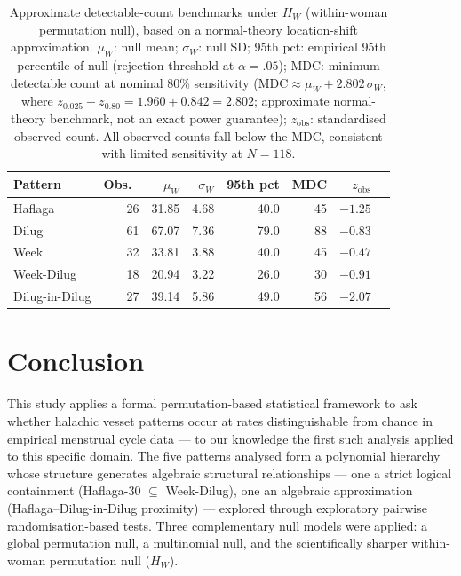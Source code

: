 \documentclass[12pt]{article}
\begin{document}
\begin{table}[ht]
\centering
\caption{Approximate detectable-count benchmarks under $H_W$ (within-woman permutation null),
  based on a normal-theory location-shift approximation.
  $\mu_W$: null mean; $\sigma_W$: null SD; 95th pct: empirical 95th percentile
  of null (rejection threshold at $\alpha = .05$); MDC: minimum detectable count
  at nominal 80\% sensitivity ($\text{MDC} \approx \mu_W + 2.802\,\sigma_W$, where
  $z_{0.025} + z_{0.80} = 1.960 + 0.842 = 2.802$; approximate normal-theory benchmark, not an exact power guarantee); $z_{\text{obs}}$: standardised
  observed count.
  All observed counts fall below the MDC, consistent with limited sensitivity
  at $N = 118$.}
\label{tab:power}
\begin{tabular}{lrrrrrrr}
\hline
Pattern & Obs.\ & $\mu_W$ & $\sigma_W$ & 95th pct & MDC & $z_{\text{obs}}$ \\
\hline
Haflaga        & 26 & 31.85 & 4.68 & 40.0 & 45 & $-1.25$ \\
Dilug          & 61 & 67.07 & 7.36 & 79.0 & 88 & $-0.83$ \\
Week           & 32 & 33.81 & 3.88 & 40.0 & 45 & $-0.47$ \\
Week-Dilug     & 18 & 20.94 & 3.22 & 26.0 & 30 & $-0.91$ \\
Dilug-in-Dilug & 27 & 39.14 & 5.86 & 49.0 & 56 & $-2.07$ \\
\hline
\end{tabular}
\end{table}

\section{Conclusion}

This study applies a formal permutation-based statistical framework to ask whether halachic vesset
patterns occur at rates distinguishable from chance in empirical menstrual cycle data --- to our
knowledge the first such analysis applied to this specific domain. The five patterns
analysed form a polynomial hierarchy whose structure generates algebraic structural
relationships --- one a strict logical containment (Haflaga-30 $\subseteq$ Week-Dilug),
one an algebraic approximation (Haflaga--Dilug-in-Dilug proximity) --- explored
through exploratory pairwise randomisation-based tests. Three complementary null
models were applied: a global permutation null, a multinomial null, and the
scientifically sharper within-woman permutation null ($H_W$).
\end{document}
